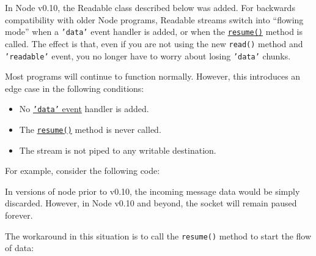 In Node v0.10, the Readable class described below was added. For
backwards compatibility with older Node programs, Readable streams
switch into ``flowing mode'' when a \texttt{'data'} event handler is
added, or when the
\hyperref[streamux5freadableux5fresume]{\texttt{resume()}} method is
called. The effect is that, even if you are not using the new
\texttt{read()} method and \texttt{'readable'} event, you no longer have
to worry about losing \texttt{'data'} chunks.

Most programs will continue to function normally. However, this
introduces an edge case in the following conditions:

\begin{itemize}
\itemsep1pt\parskip0pt
\item
  No \hyperref[streamux5feventux5fdata]{\texttt{'data'} event} handler
  is added.
\item
  The \hyperref[streamux5freadableux5fresume]{\texttt{resume()}} method
  is never called.
\item
  The stream is not piped to any writable destination.
\end{itemize}

For example, consider the following code:

\begin{Shaded}
\begin{Highlighting}[]
\NormalTok{(}

  \NormalTok{(}\NormalTok{, }\NormalTok{() \{}
    \NormalTok{(}\NormalTok{);}
  \NormalTok{\});}

\NormalTok{(}\NormalTok{);}
\end{Highlighting}
\end{Shaded}

In versions of node prior to v0.10, the incoming message data would be
simply discarded. However, in Node v0.10 and beyond, the socket will
remain paused forever.

The workaround in this situation is to call the \texttt{resume()} method
to start the flow of data:

